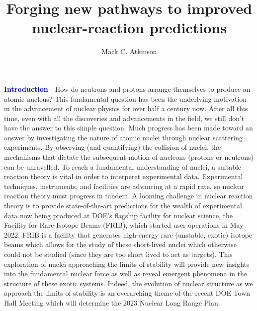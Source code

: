 \documentclass[12pt]{article}
\begin{document}
\title{Forging new pathways to improved nuclear-reaction predictions}
\author{Mack C. Atkinson}
\maketitle

\textcolor{blue}{\textbf{Introduction}}
 - How do neutrons and protons arrange themselves to produce an atomic nucleus? This fundamental question has been the underlying motivation in the advancement of nuclear physics
 for over half a century now. After all this time, even with all the discoveries and advancements in the field, we still don't have the answer to this simple question. Much
 progress has been made toward an answer by investigating the nature of atomic nuclei through nuclear scattering experiments. By observing (and quantifying) the collision of
 nuclei, the mechanisms that dictate the subsequent motion of nucleons (protons or neutrons) can be unravelled. 
 To reach a fundamental understanding of nuclei, a suitable reaction theory is vital in order to interperet experimental data. Experimental techniques, instruments, and facilities
 are advancing at a rapid rate, so nuclear reaction theory must progress in tandem. A looming challenge in nuclear reaction theory is to provide state-of-the-art predictions for
 the wealth of experimental data now being produced at DOE's flagship facility for nuclear science, the Facility for Rare Isotope Beams (FRIB), which started user operations in May
 2022. FRIB is a facility that generates high-energy rare (unstable, exotic) isotope beams which allows for the study of these short-lived nuclei
 which otherwise could not be studied (since they are too short lived to act as targets). This exploration of nuclei approaching the limits of
 stability will provide new insights into the fundamental nuclear force as well as reveal emergent phenomena in the structure of these exotic systems. 
   Indeed, the evolution of nuclear structure as we approach the limits of stability is an overarching theme of the recent DOE Town Hall Meeting
 which will determine the 2023 Nuclear Long Range Plan.
\end{document}
